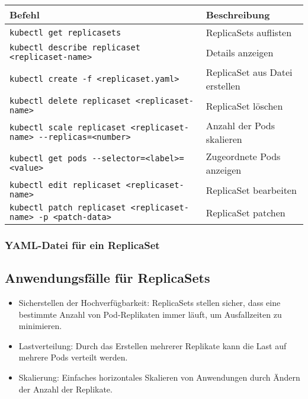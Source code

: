 \noindent
\begin{tabular}{|p{}|p{}|}
\hline
\textbf{Befehl} & \textbf{Beschreibung} \\
\hline
\texttt{kubectl get replicasets} & ReplicaSets auflisten \\
\texttt{kubectl describe replicaset <replicaset-name>} & Details anzeigen \\
\texttt{kubectl create -f <replicaset.yaml>} & ReplicaSet aus Datei erstellen \\
\texttt{kubectl delete replicaset <replicaset-name>} & ReplicaSet löschen \\
\texttt{kubectl scale replicaset <replicaset-name> {-}{-}replicas=<number>} & Anzahl der Pods skalieren \\
\texttt{kubectl get pods {-}{-}selector=<label>=<value>} & Zugeordnete Pods anzeigen \\
\texttt{kubectl edit replicaset <replicaset-name>} & ReplicaSet bearbeiten \\
\texttt{kubectl patch replicaset <replicaset-name> -p <patch-data>} & ReplicaSet patchen \\
\hline
\end{tabular}
\newpage
\subsubsection{YAML-Datei für ein ReplicaSet}


\subsection{Anwendungsfälle für ReplicaSets}
\begin{itemize}
    \item Sicherstellen der Hochverfügbarkeit: ReplicaSets stellen sicher, dass eine bestimmte Anzahl von Pod-Replikaten immer läuft, um Ausfallzeiten zu minimieren.
    \item Lastverteilung: Durch das Erstellen mehrerer Replikate kann die Last auf mehrere Pods verteilt werden.
    \item Skalierung: Einfaches horizontales Skalieren von Anwendungen durch Ändern der Anzahl der Replikate.
\end{itemize}

